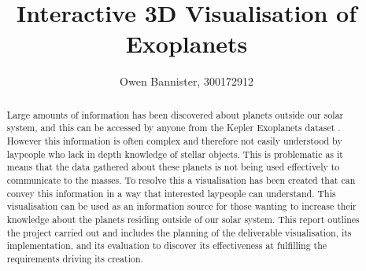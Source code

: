 \documentclass[11pt
              , a4paper
              , twoside
              , openright
              ]{report}
\title{Interactive 3D Visualisation of Exoplanets}
\author{Owen Bannister, 300172912}
\date{}
\begin{document}
\frontmatter



\begin{abstract}


Large amounts of information has been discovered about planets outside our solar system, and this can be accessed by anyone from the Kepler
Exoplanets dataset \cite{datasetphl} \cite{dataset}. However this information is often
complex and therefore not easily understood by laypeople who lack in depth knowledge of stellar objects. This is problematic as it
means that the data gathered about these planets is not being used
effectively to communicate to the masses. To resolve this a
visualisation has been created that can convey this information in a way that
interested laypeople can understand. This visualisation can be used as an
information source for those wanting to increase their knowledge about the
planets residing outside of our solar system. This report outlines the project                                                                                                                                                                                                                                    
carried out and includes the planning of the deliverable visualisation, its implementation, and its
evaluation to discover its effectiveness at fulfilling the requirements driving its
creation.


\end{abstract}


\maketitle



\tableofcontents



\mainmatter











\end{document}

